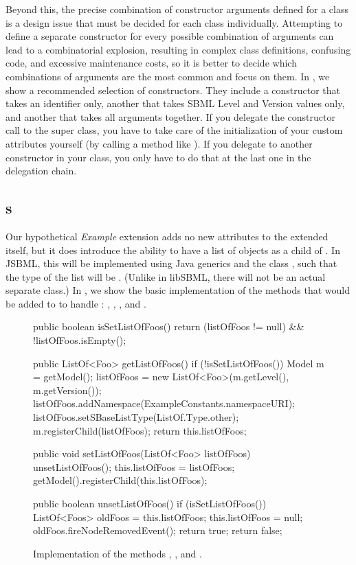 Beyond this, the precise combination of constructor arguments defined for a
class is a design issue that must be decided for each class individually.
Attempting to define a separate constructor for every possible combination
of arguments can lead to a combinatorial explosion, resulting in complex
class definitions, confusing code, and excessive maintenance costs, so it
is better to decide which combinations of arguments are the most common and
focus on them.  In , we show a
recommended selection of constructors.  They include a constructor that
takes an identifier only, another that takes SBML Level and Version values
only, and another that takes all arguments together.  If you delegate the
constructor call to the super class, you have to take care of the
initialization of your custom attributes yourself (by calling a method like
).  If you delegate to another constructor in your
class, you only have to do that at the last one in the delegation chain.


\subsection{s}
\label{sec:listofs}

Our hypothetical \emph{Example} extension adds no new attributes to the
extended \Model itself, but it does introduce the ability to have a list of
 objects as a child of \Model.  In JSBML, this will be
implemented using Java generics and the class , such that the
type of the list will be .  (Unlike in libSBML, there
will not be an actual separate  class.)  In
, we show the basic implementation
of the methods that would be added to \Model to handle
: , ,
, and .

\begin{figure}[b]
  \begin{example}[numbers=left]
public boolean isSetListOfFoos() {
  return (listOfFoos != null) && !listOfFoos.isEmpty();
}

public ListOf<Foo> getListOfFoos() {
  if (!isSetListOfFoos()) {
    Model m = getModel();
    listOfFoos = new ListOf<Foo>(m.getLevel(), m.getVersion());
    listOfFoos.addNamespace(ExampleConstants.namespaceURI);
    listOfFoos.setSBaseListType(ListOf.Type.other);
    m.registerChild(listOfFoos);
  }
  return this.listOfFoos;
}

public void setListOfFoos(ListOf<Foo> listOfFoos) {
  unsetListOfFoos();
  this.listOfFoos = listOfFoos;
  getModel().registerChild(this.listOfFoos);
}

public boolean unsetListOfFoos() {
  if (isSetListOfFoos()) {
    ListOf<Foos> oldFoos = this.listOfFoos;
    this.listOfFoos = null;
    oldFoos.fireNodeRemovedEvent();
    return true;
  }
  return false;
}\end{example}
  \caption{Implementation of the methods ,
    , and .}
  \label{lst:ModelExtListOfFoosBasic}
\end{figure}

